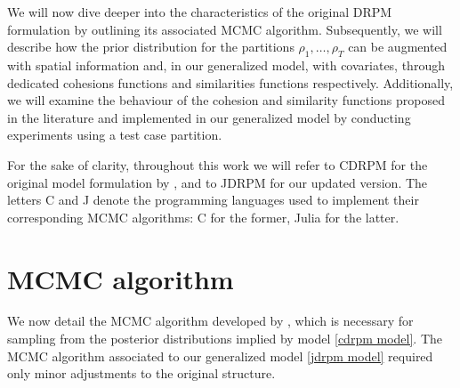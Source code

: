 \documentclass[12pt,	%
	a4paper,		%
	twoside,		%
	openright,		%
	titlepage,%
	]{book}
\theoremstyle{definition}
\let\cite\citep
\begin{document}
We will now dive deeper into the characteristics of the original DRPM formulation by outlining its associated MCMC algorithm. Subsequently, we will describe how the prior distribution for the partitions $\rho_1,\ldots,\rho_T$ can be augmented with spatial information and, in our generalized model, with covariates, through dedicated cohesions functions and similarities functions respectively. Additionally, we will examine the behaviour of the cohesion and similarity functions proposed in the literature and implemented in our generalized model by conducting experiments using a test case partition.

For the sake of clarity, throughout this work we will refer to CDRPM for the original model formulation by \cite{1-drpm}, and to JDRPM for our updated version. The letters C and J denote the programming languages used to implement their corresponding MCMC algorithms: C for the former, Julia for the latter.

\section{MCMC algorithm}
\label{MCMC algorithm}

We now detail the MCMC algorithm developed by \cite{1-drpm}, which is necessary for sampling from the posterior distributions implied by model \eqref{cdrpm model}. The MCMC algorithm associated to our generalized model \eqref{jdrpm model} required only minor adjustments to the original structure.
\end{document}
